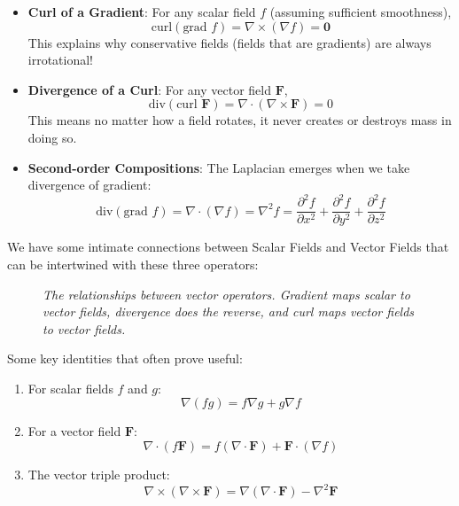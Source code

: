 \begin{itemize}
    \item \textbf{Curl of a Gradient}: For any scalar field $f$ (assuming sufficient smoothness),
    \[
    \text{curl}(\text{grad }f) = \nabla \times (\nabla f) = \mathbf{0}
    \]
    This explains why conservative fields (fields that are gradients) are always irrotational!

    \item \textbf{Divergence of a Curl}: For any vector field $\mathbf{F}$,
    \[
    \text{div}(\text{curl }\mathbf{F}) = \nabla \cdot (\nabla \times \mathbf{F}) = 0
    \]
    This means no matter how a field rotates, it never creates or destroys mass in doing so.
    \item \textbf{Second-order Compositions}: The Laplacian emerges when we take divergence of gradient:
    \[
    \text{div}(\text{grad }f) = \nabla \cdot (\nabla f) = \nabla^2f = \frac{\partial^2 f}{\partial x^2} + \frac{\partial^2 f}{\partial y^2} + \frac{\partial^2 f}{\partial z^2}
    \]
\end{itemize}

\noindent We have some intimate connections between Scalar Fields and Vector Fields that can be intertwined with these three operators:

\begin{figure}[H]
\centering
{}
\caption{\textit{The relationships between vector operators. Gradient maps scalar to vector fields, divergence does the reverse, and curl maps vector fields to vector fields.}}
\label{fig:vector_operators}
\end{figure}

\noindent Some key identities that often prove useful:

\begin{enumerate}
    \item For scalar fields $f$ and $g$:
    \[
    \nabla(fg) = f\nabla g + g\nabla f
    \]
    
    \item For a vector field $\mathbf{F}$:
    \[
    \nabla \cdot (f\mathbf{F}) = f(\nabla \cdot \mathbf{F}) + \mathbf{F} \cdot (\nabla f)
    \]
    
    \item The vector triple product:
    \[
    \nabla \times (\nabla \times \mathbf{F}) = \nabla(\nabla \cdot \mathbf{F}) - \nabla^2\mathbf{F}
    \]
\end{enumerate}

